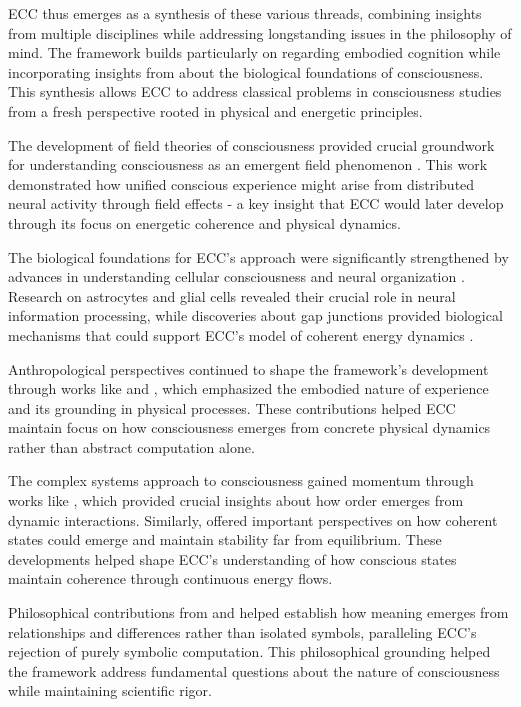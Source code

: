 ECC thus emerges as a synthesis of these various threads, combining insights from multiple disciplines while addressing longstanding issues in the philosophy of mind. The framework builds particularly on \cite{varela1991embodied} regarding embodied cognition while incorporating insights from \cite{churchland1986neurophilosophy} about the biological foundations of consciousness. This synthesis allows ECC to address classical problems in consciousness studies from a fresh perspective rooted in physical and energetic principles.

The development of field theories of consciousness provided crucial groundwork for understanding consciousness as an emergent field phenomenon \cite{hayles1999posthuman}. This work demonstrated how unified conscious experience might arise from distributed neural activity through field effects - a key insight that ECC would later develop through its focus on energetic coherence and physical dynamics.

The biological foundations for ECC's approach were significantly strengthened by advances in understanding cellular consciousness and neural organization \cite{margulis2001conscious}. Research on astrocytes and glial cells revealed their crucial role in neural information processing, while discoveries about gap junctions provided biological mechanisms that could support ECC's model of coherent energy dynamics \cite{friston2010free}.

Anthropological perspectives continued to shape the framework's development through works like \cite{ingold2000perception} and \cite{desjarlais1992body}, which emphasized the embodied nature of experience and its grounding in physical processes. These contributions helped ECC maintain focus on how consciousness emerges from concrete physical dynamics rather than abstract computation alone.

The complex systems approach to consciousness gained momentum through works like \cite{kauffman1993origins}, which provided crucial insights about how order emerges from dynamic interactions. Similarly, \cite{prigogine1984order} offered important perspectives on how coherent states could emerge and maintain stability far from equilibrium. These developments helped shape ECC's understanding of how conscious states maintain coherence through continuous energy flows.

Philosophical contributions from \cite{levi-strauss1966savage} and \cite{bourdieu1977outline} helped establish how meaning emerges from relationships and differences rather than isolated symbols, paralleling ECC's rejection of purely symbolic computation. This philosophical grounding helped the framework address fundamental questions about the nature of consciousness while maintaining scientific rigor.

